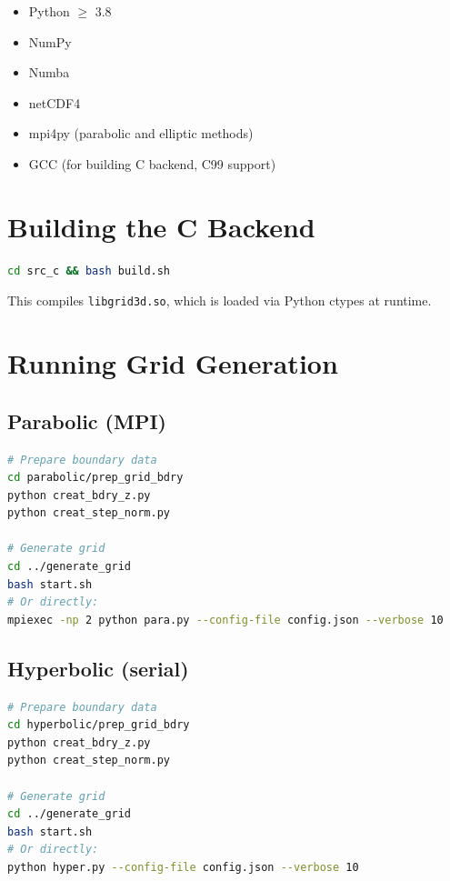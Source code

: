 \documentclass[11pt,a4paper]{report}
\begin{document}
\begin{itemize}
    \item Python $\geq$ 3.8
    \item NumPy
    \item Numba
    \item netCDF4
    \item mpi4py (parabolic and elliptic methods)
    \item GCC (for building C backend, C99 support)
\end{itemize}

\section{Building the C Backend}

\begin{lstlisting}[language=bash]
cd src_c && bash build.sh
\end{lstlisting}

This compiles \texttt{libgrid3d.so}, which is loaded via Python ctypes at runtime.

\section{Running Grid Generation}

\subsection{Parabolic (MPI)}
\begin{lstlisting}[language=bash]
# Prepare boundary data
cd parabolic/prep_grid_bdry
python creat_bdry_z.py
python creat_step_norm.py

# Generate grid
cd ../generate_grid
bash start.sh
# Or directly:
mpiexec -np 2 python para.py --config-file config.json --verbose 10
\end{lstlisting}

\subsection{Hyperbolic (serial)}
\begin{lstlisting}[language=bash]
# Prepare boundary data
cd hyperbolic/prep_grid_bdry
python creat_bdry_z.py
python creat_step_norm.py

# Generate grid
cd ../generate_grid
bash start.sh
# Or directly:
python hyper.py --config-file config.json --verbose 10
\end{lstlisting}
\end{document}
